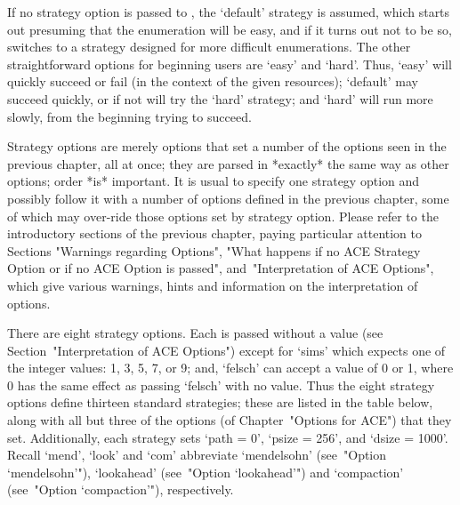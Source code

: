 If no strategy option is passed to {\ACE}, the `default'  strategy  is
assumed, which starts out presuming that the enumeration will be easy,
and if it turns out not to  be  so,  {\ACE}  switches  to  a  strategy
designed for more difficult enumerations.  The  other  straightforward
options for beginning users are `easy' and `hard'. Thus,  `easy'  will
quickly succeed or fail (in  the  context  of  the  given  resources);
`default' may succeed quickly, or if not will try the `hard' strategy;
and `hard' will run more slowly, from the beginning trying to succeed.

Strategy options  are  merely  options  that  set  a
number of the options seen in the previous chapter, all at once;
they are  parsed  in  *exactly*  the  same  way  as  other
options; order *is* important. It is usual  to  specify  one  strategy
option and possibly follow it with a number of options defined in  the
previous chapter, some of which may over-ride those options set by
strategy option. Please refer to  the  introductory  sections  of  the
previous chapter, paying particular attention  to  Sections  "Warnings
regarding Options", "What happens if no ACE Strategy Option or  if  no
ACE Option is passed", and~"Interpretation of ACE Options", which give
various warnings, hints  and  information  on  the  interpretation  of
options.

There are eight strategy options. Each is passed without a value  (see
Section~"Interpretation of  ACE  Options")  except  for  `sims'  which
expects one of the integer values: 1, 3, 5, 7, or 9; and, `felsch' can
accept a value of 0 or 1, where 0  has  the  same  effect  as  passing
`felsch' with  no  value.  Thus  the  eight  strategy  options  define
thirteen standard strategies; these are listed  in  the  table  below,
along with all but three of the options (of Chapter~"Options for ACE")
that they set. Additionally, each strategy sets `path = 0',  `psize  =
256', and `dsize = 1000'. Recall `mend', `look' and  `com'  abbreviate
`mendelsohn'  (see~"Option  `mendelsohn'"),  `lookahead'  (see~"Option
`lookahead'")   and    `compaction'    (see~"Option    `compaction'"),
respectively.


